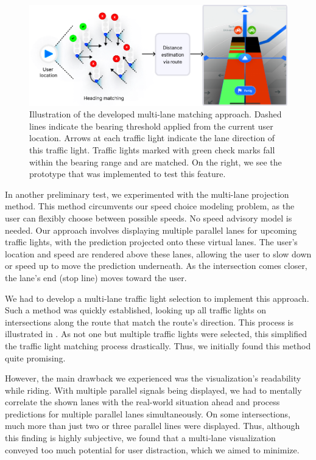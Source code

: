 \begin{figure}[t]
\centering
\includegraphics[width=\linewidth]{images/multi-lane-view.pdf}
\caption{Illustration of the developed multi-lane matching approach. Dashed lines indicate the bearing threshold applied from the current user location. Arrows at each traffic light indicate the lane direction of this traffic light. Traffic lights marked with green check marks fall within the bearing range and are matched. On the right, we see the prototype that was implemented to test this feature.}
\label{fig:multi-lane-view}
\end{figure}

In another preliminary test, we experimented with the multi-lane projection method. This method circumvents our speed choice modeling problem, as the user can flexibly choose between possible speeds. No speed advisory model is needed. Our approach involves displaying multiple parallel lanes for upcoming traffic lights, with the prediction projected onto these virtual lanes. The user's location and speed are rendered above these lanes, allowing the user to slow down or speed up to move the prediction underneath. As the intersection comes closer, the lane's end (stop line) moves toward the user. 

We had to develop a multi-lane traffic light selection to implement this approach. Such a method was quickly established, looking up all traffic lights on intersections along the route that match the route's direction. This process is illustrated in . As not one but multiple traffic lights were selected, this simplified the traffic light matching process drastically. Thus, we initially found this method quite promising.

However, the main drawback we experienced was the visualization's readability while riding. With multiple parallel signals being displayed, we had to mentally correlate the shown lanes with the real-world situation ahead and process predictions for multiple parallel lanes simultaneously. On some intersections, much more than just two or three parallel lines were displayed. Thus, although this finding is highly subjective, we found that a multi-lane visualization conveyed too much potential for user distraction, which we aimed to minimize.

